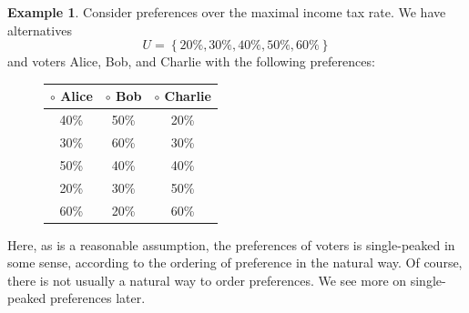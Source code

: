 \documentclass{book}
\theoremstyle{plain}
\theoremstyle{definition}
\newtheorem{example}[theorem]{Example}
\theoremstyle{remark}
\newcommand{\set}[1]{\left\{#1\right\}}
\begin{document}
\begin{example}
    Consider preferences over the 
    maximal income tax rate.
    We have alternatives 
    \[    U = \set{20\%, 30\%, 40\%, 50\%, 60\%}
    \]
    and voters Alice, Bob, and Charlie with the following preferences:

\begin{figure}[h]
\centering

\begin{minipage}{0.42\textwidth}
\centering

\begin{tabular}{ccc}
\toprule
\textcolor{blue!60!black}{$\circ$} Alice &
\textcolor{red!60!black}{$\circ$} Bob &
\textcolor{orange!70!black}{$\circ$} Charlie \\
\midrule
40\% & 50\% & 20\% \\
30\% & 60\% & 30\% \\
50\% & 40\% & 40\% \\
20\% & 30\% & 50\% \\
60\% & 20\% & 60\% \\
\bottomrule
\end{tabular}

\end{minipage}
\hfill
\begin{minipage}{0.52\textwidth}
\centering


\end{minipage}

\end{figure}

Here, as is a reasonable assumption,
the preferences of voters is 
single-peaked in some sense, 
according to the ordering of 
preference in the natural way.
Of course, there is not usually a natural way to order preferences.
We see more on single-peaked preferences later.
\end{example}
\end{document}
